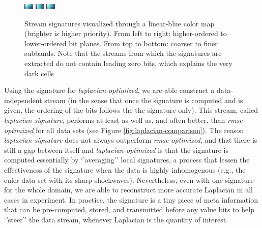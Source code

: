 \begin{figure}
	\centering
	{\includegraphics[width=0.32\linewidth]{img/gradient-laplacian/SIG-GREEDY-(rmse).png}}
	{\includegraphics[width=0.32\linewidth]{img/gradient-laplacian/SIG-GREEDY-(laplacian).png}}
	{\includegraphics[width=0.32\linewidth]{img/gradient-laplacian/SIG-GREEDY-(gradient).png}}
	\caption{Stream signatures visualized through a linear-blue color map (brighter is higher
	priority). From left to right: higher-ordered to lower-ordered bit planes. From top to bottom:
	coarser to finer subbands. Note that the streams from which the signatures are extracted do not
	contain leading zero bits, which explains the very dark cells }
	\label{fig:signature-comparison}
\end{figure}

Using the signature for \emph{laplacian-optimized}, we are able construct a data-independent stream
(in the sense that once the signature is computed and is given, the ordering of the bits follows the
the signature only). This stream, called \emph{laplacian signature}, performs at least as well as,
and often better, than \emph{rmse-optimized} for all data sets (see Figure
\ref{fig:laplacian-comparison}). The reason \emph{laplacian signature} does not always outperform
\emph{rmse-optimized}, and that there is still a gap between itself and \emph{laplacian-optimized}
is that the signature is computed essentially by `'averaging'' local signatures, a process that
lessen the effectiveness of the signature when the data is highly inhomogenous (e.g., the euler data
set with its sharp shockwaves). Nevertheless, even with one signature for the whole domain, we are
able to reconstruct more accurate Laplacian in all cases in experiment. In practice, the signature
is a tiny piece of meta information that can be pre-computed, stored, and transmitted before any
value bits to help `'steer'' the data stream, whenever Laplacian is the quantity of interest.
